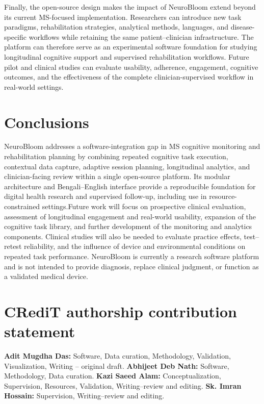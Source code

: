 \documentclass[preprint,12pt,a4paper]{elsarticle}
\begin{document}
Finally, the open-source design makes the impact of NeuroBloom extend beyond
its current MS-focused implementation. Researchers can introduce new task
paradigms, rehabilitation strategies, analytical methods, languages, and
disease-specific workflows while retaining the same patient--clinician
infrastructure. The platform can therefore serve as an experimental software foundation
for studying longitudinal cognitive support and supervised rehabilitation
workflows. Future pilot and clinical studies can evaluate usability, adherence, engagement,
cognitive outcomes, and the effectiveness of the complete
clinician-supervised workflow in real-world settings.


\section{Conclusions}

NeuroBloom addresses a software-integration gap in MS cognitive monitoring
and rehabilitation planning by combining repeated cognitive task execution,
contextual data capture, adaptive session planning, longitudinal analytics,
and clinician-facing review within a single open-source platform. Its
modular architecture and Bengali--English interface provide a reproducible
foundation for digital health research and supervised follow-up, including
use in resource-constrained settings.Future work will focus on prospective clinical evaluation, assessment of longitudinal engagement and real-world usability, expansion of the cognitive task library, and further development of the monitoring and analytics
components. Clinical studies will also be needed to evaluate practice
effects, test--retest reliability, and the influence of device and
environmental conditions on repeated task performance. NeuroBloom is
currently a research software platform and is not intended to provide
diagnosis, replace clinical judgment, or function as a validated medical
device.

\section*{CRediT authorship contribution statement}

\textbf{Adit Mugdha Das:} Software, Data curation, Methodology, Validation, Visualization, Writing -- original draft. \textbf{Abhijeet Deb Nath:} Software, Methodology, Data curation. \textbf{Kazi Saeed Alam:} Conceptualization, Supervision, Resources, Validation, Writing--review and editing. \textbf{Sk. Imran Hossain:} Supervision, Writing--review and editing.
\end{document}
